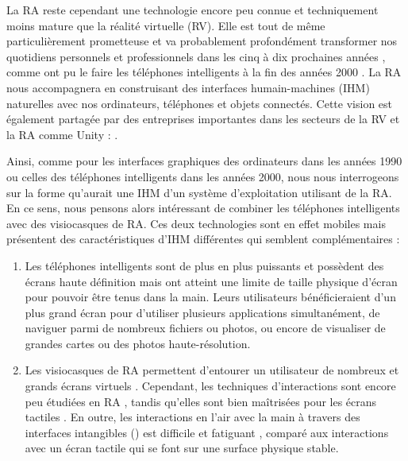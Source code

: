 La RA reste cependant une technologie encore peu connue et techniquement moins mature que la réalité virtuelle (RV). Elle est tout de même particulièrement prometteuse et va probablement profondément transformer nos quotidiens personnels et professionnels dans les cinq à dix prochaines années , comme ont pu le faire les téléphones intelligents à la fin des années 2000 \citep{Chaffey2018}. La RA nous accompagnera en construisant des interfaces humain-machines (IHM) naturelles avec nos ordinateurs, téléphones et objets connectés. Cette vision est également partagée par des entreprises importantes dans les secteurs de la RV et la RA comme Unity :  \citep{UnityFutureMRPartIII2017}.

Ainsi, comme pour les interfaces graphiques des ordinateurs dans les années 1990 ou celles des téléphones intelligents dans les années 2000, nous nous interrogeons sur la forme qu'aurait une IHM d'un système d'exploitation utilisant de la RA. En ce sens, nous pensons alors intéressant de combiner les téléphones intelligents avec des visiocasques de RA. Ces deux technologies sont en effet mobiles mais présentent des caractéristiques d'IHM différentes qui semblent complémentaires :
\begin{enumerate}
  \item Les téléphones intelligents sont de plus en plus puissants et possèdent des écrans haute définition mais ont atteint une limite de taille physique d'écran pour pouvoir être tenus dans la main. Leurs utilisateurs bénéficieraient d'un plus grand écran pour d'utiliser plusieurs applications simultanément, de naviguer parmi de nombreux fichiers ou photos, ou encore de visualiser de grandes cartes ou des photos haute-résolution.
  \item Les visiocasques de RA permettent d'entourer un utilisateur de nombreux et grands écrans virtuels \citep{Ens2014}. Cependant, 
  les techniques d'interactions sont encore peu étudiées en RA \citep{Piumsomboon2013}, tandis qu'elles sont bien maîtrisées pour les écrans tactiles \citep{Wobbrock2009}. En outre, les interactions en l'air avec la main à travers des interfaces intangibles () est difficile \citep{Chan2010} et fatiguant \citep{Hincapie-Ramos2014}, comparé aux interactions avec un écran tactile qui se font sur une surface physique stable.
\end{enumerate}
\medskip


